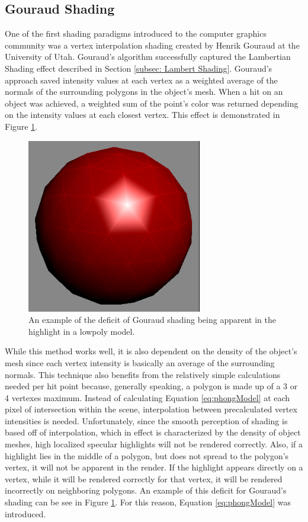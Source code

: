 \subsection{Gouraud Shading}
\label{subsec: Gouraud Shading}
One of the first shading paradigms introduced to the computer graphics community was a vertex interpolation shading created by Henrik Gouraud at the University of Utah\cite{gouraud1971}.  Gouraud's algorithm successfully captured the Lambertian Shading effect described in Section \ref{subsec: Lambert Shading}.  Gouraud's approach saved intensity values at each vertex as a weighted average of the normals of the surrounding polygons in the object's mesh.  When a hit on an object was achieved, a weighted sum of the point's color was returned depending on the intensity values at each closest vertex.  This effect is demonstrated in Figure \ref{fig:gouraudMaya}.
\begin{figure}[h]
\centering
\includegraphics[height=3.0in]{figures/gouraud_low.png}
\caption{An example of the deficit of Gouraud shading being apparent in the highlight in a lowpoly model.\cite{GouraudLow} }
\label{fig:gouraudMaya}
\end{figure}

While this method works well,  it is also dependent on the density of the object's mesh since each vertex intensity is basically an average of the surrounding normals.  This technique also benefits from the relatively simple calculations needed per hit point because, generally speaking, a polygon is made up of a 3 or 4 vertexes maximum.  Instead of calculating Equation \ref{eq:phongModel} at each pixel of intersection within the scene, interpolation between precalculated vertex intensities is needed.  Unfortunately, since the smooth perception of shading is based off of interpolation, which in effect is characterized by the density of object meshes, high localized specular highlights will not be rendered correctly.  Also, if a highlight lies in the middle of a polygon, but does not spread to the polygon's vertex, it will not be apparent in the render.  If the highlight appears directly on a vertex, while it will be rendered correctly for that vertex, it will be rendered incorrectly on neighboring polygons. An example of this deficit for Gouraud's shading can be see in Figure \ref{fig:gouraudMaya}.  For this reason, Equation \ref{eq:phongModel} was introduced.


